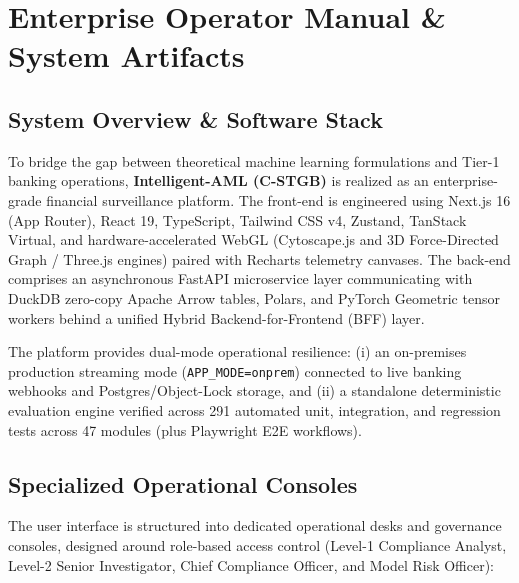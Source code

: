 \chapter{Enterprise Operator Manual \& System Artifacts}
\label{app:operator_manual}

\section{System Overview \& Software Stack}
To bridge the gap between theoretical machine learning formulations and Tier-1 banking operations, \textbf{Intelligent-AML (C-STGB)} is realized as an enterprise-grade financial surveillance platform. The front-end is engineered using Next.js 16 (App Router), React 19, TypeScript, Tailwind CSS v4, Zustand, TanStack Virtual, and hardware-accelerated WebGL (Cytoscape.js and 3D Force-Directed Graph / Three.js engines) paired with Recharts telemetry canvases. The back-end comprises an asynchronous FastAPI microservice layer communicating with DuckDB zero-copy Apache Arrow tables, Polars, and PyTorch Geometric tensor workers behind a unified Hybrid Backend-for-Frontend (BFF) layer.

The platform provides dual-mode operational resilience: (i) an on-premises production streaming mode (\texttt{APP\_MODE=onprem}) connected to live banking webhooks and Postgres/Object-Lock storage, and (ii) a standalone deterministic evaluation engine verified across 291 automated unit, integration, and regression tests across 47 modules (plus Playwright E2E workflows).

\section{Specialized Operational Consoles}
The user interface is structured into dedicated operational desks and governance consoles, designed around role-based access control (Level-1 Compliance Analyst, Level-2 Senior Investigator, Chief Compliance Officer, and Model Risk Officer):

